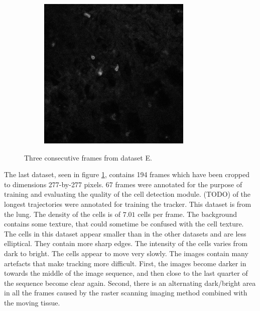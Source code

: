 \begin{figure}[h]
\begin{subfigure}{.32\textwidth}
		\end{subfigure}
		\hfill
		\begin{subfigure}{.32\textwidth}
		\includegraphics[width=\textwidth]{images/seriesm170_13cropped018}
		\end{subfigure}
		\caption{Three consecutive frames from dataset E.}
		\label{fig:data_datasetE}
	\end{figure}
        
    The last dataset, seen in figure \cref{fig:data_datasetE}, contains 194 frames which have been cropped to dimensions 277-by-277 pixels. 67 frames were annotated for the purpose of training and evaluating the quality of the cell detection module. (TODO) of the longest trajectories were annotated for training the tracker. This dataset is from the lung. The density of the cells is of $7.01$ cells per frame. The background contains some texture, that could sometime be confused with the cell texture. The cells in this dataset appear smaller than in the other datasets and are less elliptical. They contain more sharp edges. The intensity of the cells varies from dark to bright. The cells appear to move very slowly. The images contain many artefacts that make tracking more difficult. First, the images become darker in towards the middle of the image sequence, and then close to the last quarter of the sequence become clear again. Second, there is an alternating dark/bright area in all the frames caused by the raster scanning imaging method combined with the moving tissue.
    	
